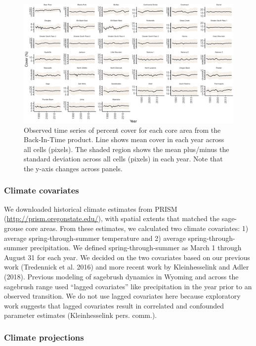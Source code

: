 \documentclass[
  12pt,
]{article}
\begin{document}
\begin{figure}
\centering
\includegraphics{sageCastManuscript_files/figure-latex/data-1.pdf}
\caption{\label{fig:data}Observed time series of percent cover for each core area from the Back-In-Time product. Line shows mean cover in each year across all cells (pixels). The shaded region shows the mean plus/minus the standard deviation across all cells (pixels) in each year. Note that the y-axis changes across panels.}
\end{figure}

\hypertarget{climate-covariates}{%
\subsubsection{Climate covariates}\label{climate-covariates}}

We downloaded historical climate estimates from PRISM (\url{http://prism.oregonstate.edu/}), with spatial extents that matched the sage-grouse core areas.
From these estimates, we calculated two climate covariates: 1) average spring-through-summer temperature and 2) average spring-through-summer precipitation.
We defined spring-through-summer as March 1 through August 31 for each year.
We decided on the two covariates based on our previous work (Tredennick et al. 2016) and more recent work by Kleinhesselink and Adler (2018).
Previous modeling of sagebrush dynamics in Wyoming and across the sagebrush range used ``lagged covariates'' like precipitation in the year prior to an observed transition.
We do not use lagged covariates here because exploratory work suggests that lagged covariates result in correlated and confounded parameter estimates (Kleinhesselink pers. comm.).

\hypertarget{climate-projections}{%
\subsubsection{Climate projections}\label{climate-projections}}
\end{document}
